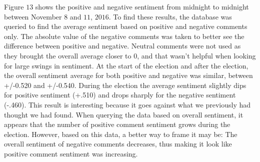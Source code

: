 \documentclass[letterpaper]{article}
\begin{document}
Figure $13$ shows the positive and negative sentiment from midnight to midnight between November $8$ and $11$, $2016$. To find these results, the database was queried to find the average sentiment based on positive and negative comments only. The absolute value of the negative comments was taken to better see the difference between positive and negative. Neutral comments were not used as they brought the overall average closer to $0$, and that wasn't helpful when looking for large swings in sentiment. At the start of the election and after the election, the overall sentiment average for both positive and negative was similar, between +/-0.520 and +/-0.540. During the election the average sentiment slightly dips for positive sentiment (+.510) and drops sharply for the negative sentiment (-.460). This result is interesting because it goes against what we previously had thought we had found. When querying the data based on overall sentiment, it appears that the number of positive comment sentiment grows during the election. However, based on this data, a better way to frame it may be: The overall sentiment of negative comments decreases, thus making it look like positive comment sentiment was increasing.
\end{document}

